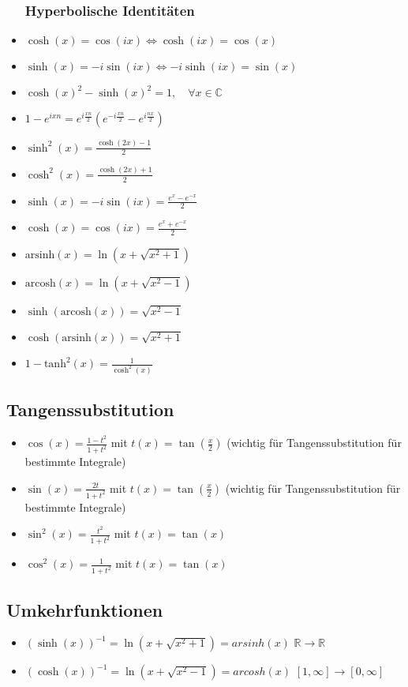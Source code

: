 \documentclass[a3paper, 11pt, landscape]{scrartcl}
\begin{document}
\begin{multicols*}{3}
\begin{itemize}
	    \subsubsection{Hyperbolische Identitäten}
	    \item $\cosh (x) = \cos(ix) \iff \cosh(ix)=\cos(x)$
	    \item $\sinh (x)=-i \sin (ix) \iff -i \sinh(ix) = \sin(x)$
	    \item $\cosh(x)^2-\sinh(x)^2=1, \quad \forall x \in \mathbb{C}$
	    \item $1-e^{ixn}=e^{i\frac{xn}{2}}(e^{-i\frac{xn}{2}}-e^{i\frac{nx}{2}})$
	    \item $\sinh^2(x)=\frac{\cosh(2x)-1}{2}$
    	\item $\cosh^2(x)=\frac{\cosh(2x)+1}{2}$
    	
    	\item $\sinh(x)=-i\sin(ix)=\frac{e^x-e^{-x}}{2}$
    	\item $\cosh(x)=\cos(ix)=\frac{e^x+e^{-x}}{2}$
    	
    	\item $\text{arsinh}(x)=\ln\left(x+\sqrt{x^2+1}\right)$
    	\item $\text{arcosh}(x)=\ln\left(x+\sqrt{x^2-1}\right)$
    	\item $\sinh(\text{arcosh}(x))=\sqrt{x^2-1}$
    	\item $\cosh(\text{arsinh}(x))=\sqrt{x^2+1}$
    	\item $1-\text{tanh}^2(x)=\frac{1}{\cosh^2(x)}$
	\end{itemize}
	
	\subsection{Tangenssubstitution}
	\begin{itemize}
	    \item $\cos (x) = \frac{1-t^2}{1+t^2}$ mit $t(x) = \tan (\frac{x}{2})$ (wichtig für Tangenssubstitution für bestimmte Integrale)
	    \item $\sin (x) = \frac{2t}{1+t^2}$ mit $t(x) = \tan (\frac{x}{2})$ (wichtig für Tangenssubstitution für bestimmte Integrale)
	    \item $\sin^2(x)=\frac{t^2}{1+t^2}$ mit $t(x)=\tan(x)$
	    \item $\cos^2(x)=\frac{1}{1+t^2}$ mit $t(x)=\tan(x)$
	\end{itemize}
	
	\subsection{Umkehrfunktionen}
	\begin{itemize}
	    \item $(\sinh(x))^{-1} = \ln(x+\sqrt{x^2 + 1}) = arsinh(x)$ $\mathbb{R}\to\mathbb{R}$
	    \item $(\cosh(x))^{-1} = \ln(x+\sqrt{x^2 - 1}) = arcosh(x)$ $[1,\infty]\to [0,\infty]$
	\end{itemize}
	

\end{multicols*}
\end{document}
